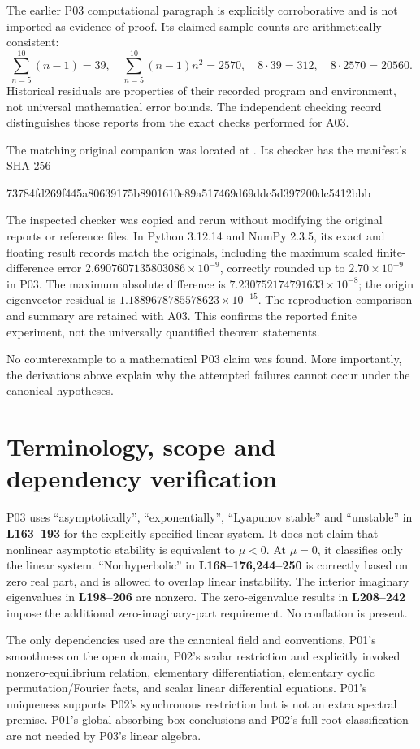 \documentclass[11pt]{article}
\newcommand{\lin}[1]{\textbf{L#1}}
\newcommand{\sha}[2]{\par{\small\ttfamily #1\allowbreak #2}\par}
\begin{document}
The earlier P03 computational paragraph is explicitly corroborative and
is not imported as evidence of proof. Its claimed sample counts are
arithmetically consistent:
\[
 \sum_{n=5}^{10}(n-1)=39,\quad
 \sum_{n=5}^{10}(n-1)n^2=2570,\quad
 8\cdot39=312,\quad8\cdot2570=20560.
\]
Historical residuals are properties of their recorded program and environment,
not universal mathematical error bounds. The independent checking record
distinguishes those reports from the exact checks performed for A03.

The matching original companion was located at
. Its checker has the manifest's
SHA-256
\sha{73784fd269f445a80639175b8901610e}{89a517469d69ddc5d397200dc5412bbb}
The inspected checker was copied and rerun without modifying the original
reports or reference files. In Python 3.12.14 and NumPy 2.3.5, its exact and
floating result records match the originals, including the maximum scaled
finite-difference error $2.6907607135803086\times10^{-9}$, correctly rounded
up to $2.70\times10^{-9}$ in P03. The maximum absolute difference is
$7.230752174791633\times10^{-8}$; the origin eigenvector residual is
$1.1889678785578623\times10^{-15}$. The reproduction comparison and summary
are retained with A03. This confirms the reported finite experiment, not
the universally quantified theorem statements.

No counterexample to a mathematical P03 claim was found. More importantly,
the derivations above explain why the attempted failures cannot occur under
the canonical hypotheses.

\section{Terminology, scope and dependency verification}
P03 uses ``asymptotically'', ``exponentially'', ``Lyapunov stable'' and
``unstable'' in \lin{163--193} for the explicitly specified linear system.
It does not claim that nonlinear asymptotic stability is equivalent to
$\mu<0$. At $\mu=0$, it classifies only the linear system. ``Nonhyperbolic''
in \lin{168--176,244--250} is correctly based on zero real part, and is
allowed to overlap linear instability. The interior imaginary eigenvalues
in \lin{198--206} are nonzero. The zero-eigenvalue results in
\lin{208--242} impose the additional zero-imaginary-part requirement.
No conflation is present.

The only dependencies used are the canonical field and conventions, P01's
smoothness on the open domain, P02's scalar restriction and explicitly invoked
nonzero-equilibrium relation, elementary differentiation, elementary cyclic
permutation/Fourier facts, and scalar linear differential equations.
P01's uniqueness supports P02's synchronous restriction but is not an extra
spectral premise. P01's global absorbing-box conclusions and P02's full root
classification are not needed by P03's linear algebra.
\end{document}
